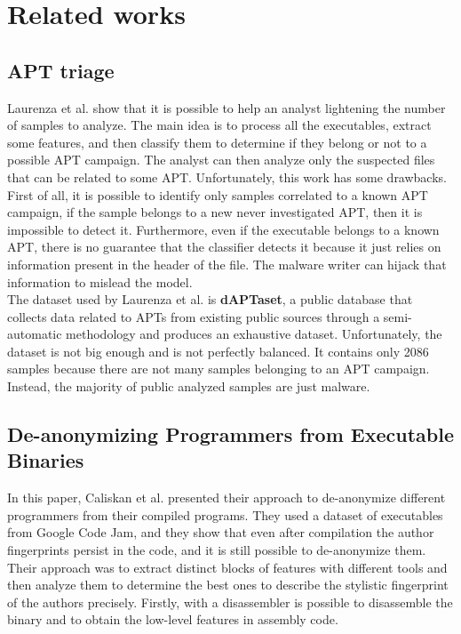 \chapter{Related works}
\section{APT triage}
Laurenza et al. show that it is possible to help an analyst lightening the number of samples to analyze. The main idea is to process all the executables, extract some features, and then classify them to determine if they belong or not to a possible APT campaign. The analyst can then analyze only the suspected files that can be related to some APT. Unfortunately, this work has some drawbacks. First of all, it is possible to identify only samples correlated to a known APT campaign, if the sample belongs to a new never investigated APT, then it is impossible to detect it. Furthermore, even if the executable belongs to a known APT, there is no guarantee that the classifier detects it because it just relies on information present in the header of the file. The malware writer can hijack that information to mislead the model. \\


The dataset used by Laurenza et al. is \textbf{dAPTaset}, a public database that collects data related to APTs from existing public sources through a semi-automatic methodology and produces an exhaustive dataset. Unfortunately, the dataset is not big enough and is not perfectly balanced. It contains only 2086 samples because there are not many samples belonging to an APT campaign. Instead, the majority of public analyzed samples are just malware.

\section{De-anonymizing Programmers from Executable Binaries}
In this paper, Caliskan et al. presented their approach to de-anonymize different programmers from their compiled programs. They used a dataset of executables from Google Code Jam, and they show that even after compilation the author fingerprints persist in the code, and it is still possible to de-anonymize them.\\

Their approach was to extract distinct blocks of features with different tools and then analyze them to determine the best ones to describe the stylistic fingerprint of the authors precisely. Firstly,  with a disassembler is possible to disassemble the binary and to obtain the low-level features in assembly code.

